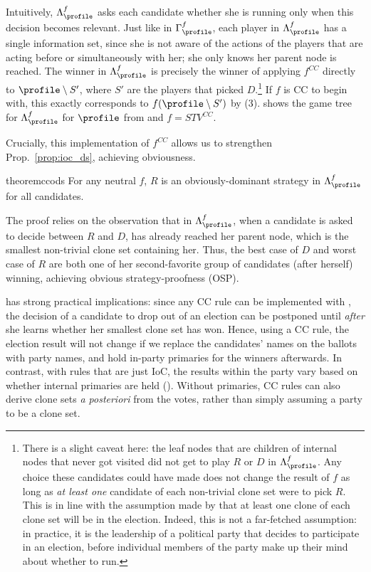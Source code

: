 Intuitively, $\Lambda_{\profile}^f$ asks each candidate whether she is running only when this decision becomes relevant. Just like in $\Gamma^f_{\profile}$, each player in $\Lambda^f_{\profile}$ has a single information set, since she is not aware of the actions of the players that are acting before or simultaneously with her; she only knows her parent node is reached. The winner in $\Lambda_{\profile}^f$ is precisely the winner of applying $f^{CC}$ directly to $\profile \setminus S'$, where $S'$ are the players that picked $D$.\footnote{There is a slight caveat here: the leaf nodes that are children of internal nodes that never got visited did not get to play $R$ or $D$ in  $\Lambda^f_{\profile}$. Any choice these candidates could have made does not change the result of $f$ as long as \emph{at least one} candidate of each non-trivial clone set were to pick $R$. This is in line with the assumption made by \citet{Elkind11:Cloning} that at least one clone of each clone set will be in the election. Indeed, this is not a far-fetched assumption: in practice, it is the leadership of a political party that decides to participate in an election, before individual members of the party make up their mind about whether to run.} If $f$ is CC to begin with, this exactly corresponds to $f(\profile \setminus S')$ by (3).  shows the game tree for $\Lambda_{\profile}^f$ for $\profile$ from  and $f=STV^{CC}$.

Crucially, this implementation of $f^{CC}$ allows us to strengthen Prop.~\ref{prop:ioc_ds}, achieving obviousness.
\begin{restatable}{theorem}{ccods}\label{thm:cc_ods}
    For any neutral $f$, $R$ is an obviously-dominant strategy in $\Lambda^f_{\profile}$ for all candidates.
\end{restatable}
The proof relies on the observation that in  $\Lambda^f_{\profile}$, when a candidate is asked to decide between $R$ and $D$,  has already reached her parent node, which is the smallest non-trivial clone set containing her. Thus, the best case of $D$ and worst case of $R$ are both one of her second-favorite group of candidates (after herself) winning, achieving obvious strategy-proofness (OSP).

 has strong practical implications: since any CC rule can be implemented with , the decision of a candidate to drop out of an election can be postponed until \emph{after} she learns whether her smallest clone set has won. Hence, using a CC rule, the election result will not change if we replace the candidates' names on the ballots with party names, and hold in-party primaries for the winners afterwards. In contrast, with rules that are just IoC, the results within the party vary based on whether internal primaries are held (). Without primaries, CC rules can also derive clone sets \emph{a posteriori} from the votes, rather than simply assuming a party to be a clone set.

